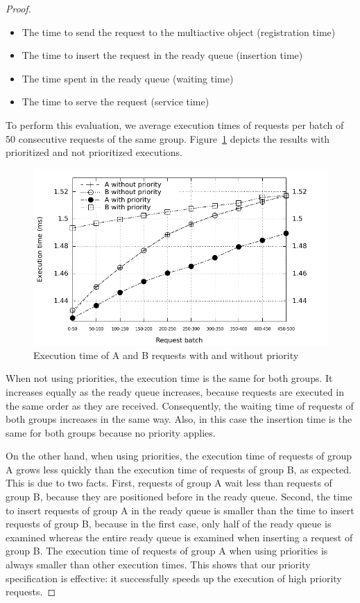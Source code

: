 \documentclass[11pt]{report}
\begin{document}
\begin{proof}
\begin{itemize}
\item The time to send the request to the multiactive object (registration time)
\item The time to insert the request in the ready queue (insertion time)
\item The time spent in the ready queue (waiting time)
\item The time to serve the request (service time)
\end{itemize}

To perform this evaluation, we average execution times of requests per batch of 50 consecutive requests of the same group. Figure~\ref{fig:effectivity} depicts the results with prioritized and not prioritized executions.
\begin{figure}[!ht]
      \begin{minipage}[c]{\textwidth}
      \centering
      \includegraphics[scale=1]{pictures/effectivity.pdf}
      \end{minipage}
      \caption{Execution time of A and B requests with and without priority}
      \label{fig:effectivity} 
\end{figure}
When not using priorities, the execution time is the same for both groups. It increases equally as the ready queue increases, because requests are executed in the same order as they are received. Consequently, the waiting time of requests of both groups increases in the same way. Also, in this case the insertion time is the same for both groups because no priority applies.

On the other hand, when using priorities, the execution time of requests of group A grows less quickly than the execution time of requests of group B, as expected. This is due to two facts. First, requests of group A wait less than requests of group B, because they are positioned before in the ready queue. Second, the time to insert requests of group A in the ready queue is smaller than the time to insert requests of group B, because in the first case, only half of the ready queue is examined whereas the entire ready queue is examined when inserting a request of group B. The execution time of requests of group A when using priorities is always smaller than other execution times. This shows that our priority specification is effective: it successfully speeds up the execution of high priority requests. 


\end{proof}
\end{document}
